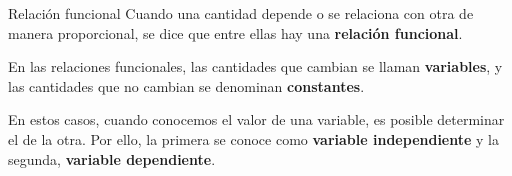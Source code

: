 \begin{infocard}{Relación funcional}
    Cuando una cantidad depende o se relaciona con otra de manera proporcional, se
    dice que entre ellas hay una \textbf{relación funcional}.

    En las relaciones funcionales, las
    cantidades que cambian se llaman \textbf{variables}, y las cantidades que no cambian se
    denominan \textbf{constantes}.

    En estos casos, cuando conocemos el valor de una variable,
    es posible determinar el de la otra. Por ello, la primera se conoce como \textbf{variable independiente} y la segunda, \textbf{variable dependiente}.
\end{infocard}